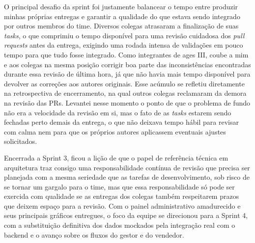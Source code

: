 O principal desafio da sprint foi justamente balancear o tempo entre produzir minhas próprias entregas e garantir a qualidade do que estava sendo integrado por outros membros do time. Diversos colegas atrasaram a finalização de suas \textit{tasks}, o que comprimiu o tempo disponível para uma revisão cuidadosa dos \textit{pull requests} antes da entrega, exigindo uma rodada intensa de validações em pouco tempo para que tudo fosse integrado. Como integrantes de \ac{ages} III, coube a mim e aos colegas na mesma posição corrigir boa parte das inconsistências encontradas durante essa revisão de última hora, já que não havia mais tempo disponível para devolver as correções aos autores originais. Esse acúmulo se refletiu diretamente na retrospectiva de encerramento, na qual outros colegas reclamaram da demora na revisão das PRs. Levantei nesse momento o ponto de que o problema de fundo não era a velocidade da revisão em si, mas o fato de as \textit{tasks} estarem sendo fechadas perto demais da entrega, o que não deixava tempo hábil para revisar com calma nem para que os próprios autores aplicassem eventuais ajustes solicitados.

Encerrada a Sprint 3, ficou a lição de que o papel de referência técnica em arquitetura traz consigo uma responsabilidade contínua de revisão que precisa ser planejada com a mesma seriedade que as tarefas de desenvolvimento, sob risco de se tornar um gargalo para o time, mas que essa responsabilidade só pode ser exercida com qualidade se as entregas dos colegas também respeitarem prazos que deixem espaço para a revisão. Com o painel administrativo amadurecido e seus principais gráficos entregues, o foco da equipe se direcionou para a Sprint 4, com a substituição definitiva dos dados mockados pela integração real com o backend e o avanço sobre os fluxos do gestor e do vendedor.
